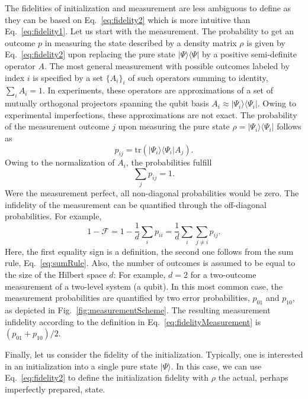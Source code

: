 \documentclass[aps, prx, showpacs, twocolumn, superscriptaddress, notitlepage, longbibliography, floatfix, nofootinbib]{revtex4-2}
\begin{document}
The fidelities of initialization and measurement are less ambiguous to define as they can be based on Eq.~\eqref{eq:fidelity2} which is more intuitive than Eq.~\eqref{eq:fidelity1}. Let us start with the measurement. The probability to get an outcome $p$ in measuring the state described by a density matrix $\rho$ is given by Eq.~\eqref{eq:fidelity2} upon replacing the pure state $|\Psi\rangle\langle\Psi|$ by a positive semi-definite operator $A$. 
The most general measurement with possible outcomes labeled by index $i$ is specified by a set $\{A_i\}_i$ of such operators summing to identity, $\sum_i A_i = 1$. In experiments, these operators are approximations of a set of mutually orthogonal projectors spanning the qubit basis $A_i \approx |\Psi_i\rangle \langle \Psi_i|$. Owing to experimental imperfections, these approximations are not exact. The probability of the measurement outcome $j$ upon measuring the pure state $\rho=|\Psi_i\rangle\langle\Psi_i|$ follows as
\begin{equation}
p_{ij} = \mathrm{tr} \left(  |\Psi_i\rangle\langle \Psi_i| A_j \right).
\end{equation}
Owing to the normalization of $A_i$, the probabilities fulfill
\begin{equation}
\sum_j p_{ij}=1.
\label{eq:sumRule}
\end{equation}
Were the measurement perfect, all non-diagonal probabilities would be zero. The infidelity of the measurement can be quantified through the off-diagonal probabilities. For example,
\begin{equation}
1-\mathcal{F} = 1 - \frac{1}{d} \sum_i p_{ii} = \frac{1}{d} \sum_i \sum_{j\neq i} p_{ij}.
\label{eq:fidelityMeasurement}
\end{equation}
Here, the first equality sign is a definition, the second one follows from the sum rule, Eq.~\eqref{eq:sumRule}. Also, the number of outcomes is assumed to be equal to the size of the Hilbert space $d$: For example, $d=2$ for a two-outcome measurement of a two-level system (a qubit). In this most common case, the measurement probabilities are quantified by two error probabilities, $p_{01}$ and $p_{10}$, as depicted in Fig.~\ref{fig:measurementScheme}. The resulting measurement infidelity according to the definition in Eq.~\eqref{eq:fidelityMeasurement} is $(p_{01}+p_{10})/2$.

Finally, let us consider the fidelity of the initialization. Typically, one is interested in an initialization into a single pure state $|\Psi\rangle$. In this case, we can use Eq.~\eqref{eq:fidelity2} to define the initialization fidelity with $\rho$ the actual, perhaps imperfectly prepared, state. 
\end{document}

